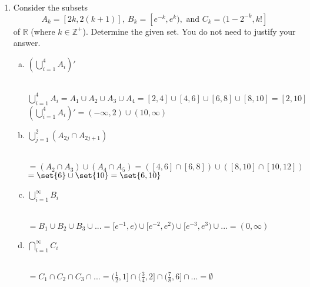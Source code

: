 \documentclass[12pt]{amsart}
\begin{document}
\begin{enumerate}[{\bfseries 1.}]
\newpage
\item Consider the subsets
	$$A_{k}=[2k, 2(k+1)],\ B_{k}=[e^{-k}, e^{k}),\text{ and } C_{k}=(1-2^{-k}, k!]$$
	of $\mathbb{R}$ (where $k\in\mathbb{Z}^{+}$).
	Determine the given set.  You do not need to justify your answer.
	\begin{enumerate}[(a)]
	\vspace{0.1in}
	\item $\left(\displaystyle\bigcup_{i=1}^{4}A_{i}\right)'$
	    \begin{normalize}
    	\vspace{0.1in}
    	\\ $\displaystyle\bigcup_{i=1}^{4}A_{i} = A_{1} \cup A_{2} \cup A_{3} \cup A_{4} = [2, 4] \cup [4, 6] \cup [6, 8] \cup [8, 10] = [2, 10]$
    	\\ $\left(\displaystyle\bigcup_{i=1}^{4}A_{i}\right)' = (-\infty, 2) \cup (10, \infty)$
    	\end{normalize}
	\vspace{0.1in}
	\item $\displaystyle\bigcup_{j=1}^{2}\left(A_{2j}\cap A_{2j+1}\right)$
		\begin{normalize}
    	\vspace{0.1in}
    	\\ $= (A_{2} \cap A_{3}) \cup (A_{4} \cap A_{5}) = ([4, 6] \cap [6, 8]) \cup ([8, 10] \cap [10, 12])$
    	\\ $= \set{6} \cup \set{10} = \set{6, 10}$
    	\end{normalize}
	\vspace{0.1in}
	\item $\displaystyle\bigcup_{i=1}^{\infty}B_{i}$
		\begin{normalize}
    	\vspace{0.1in}
    	\\ $= B_{1} \cup B_{2} \cup B_{3} \cup ... = [e^{-1}, e) \cup [e^{-2}, e^2) \cup [e^{-3}, e^3) \cup ... = (0, \infty)$
    	\end{normalize}
	\vspace{0.1in}
	\item $\displaystyle\bigcap_{i=1}^{\infty}C_{i}$
		\begin{normalize}
    	\vspace{0.1in}
    	\\ $= C_{1} \cap C_{2} \cap C_{3} \cap ... = (\frac{1}{2}, 1] \cap (\frac{3}{4}, 2] \cap (\frac{7}{8}, 6] \cap ... = \emptyset$
    	\end{normalize}
	\end{enumerate}


\end{enumerate}
\end{document}

